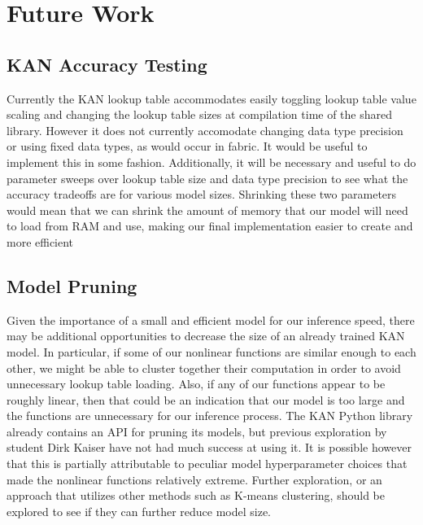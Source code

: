 \documentclass[psamsfonts]{amsart}
\theoremstyle{definition}
\theoremstyle{remark}
\numberwithin{equation}{section}
\begin{document}

\section{Future Work}
\subsection{KAN Accuracy Testing}
Currently the KAN lookup table accommodates easily toggling lookup table value scaling and changing the lookup table sizes at compilation time of the shared library. However it does not currently accomodate changing data type precision or using fixed data types, as would occur in fabric. It would be useful to implement this in some fashion. Additionally, it will be necessary and useful to do parameter sweeps over lookup table size and data type precision to see what the accuracy tradeoffs are for various model sizes. Shrinking these two parameters would mean that we can shrink the amount of memory that our model will need to load from RAM and use, making our final implementation easier to create and more efficient

\subsection{Model Pruning}
Given the importance of a small and efficient model for our inference speed, there may be additional opportunities to decrease the size of an already trained KAN model. In particular, if some of our nonlinear functions are similar enough to each other, we might be able to cluster together their computation in order to avoid unnecessary lookup table loading. Also, if any of our functions appear to be roughly linear, then that could be an indication that our model is too large and the functions are unnecessary for our inference process. The KAN Python library already contains an API for pruning its models, but previous exploration by student Dirk Kaiser have not had much success at using it. It is possible however that this is partially attributable to peculiar model hyperparameter choices that made the nonlinear functions relatively extreme. Further exploration, or an approach that utilizes other methods such as K-means clustering, should be explored to see if they can further reduce model size.
\end{document}

